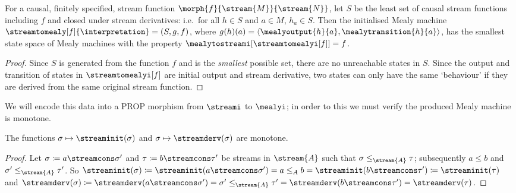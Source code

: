 \begin{corollary}\label{cor:minimal-mealy}
    For a causal, finitely specified, stream function \(
    \morph{f}{\stream{M}}{\stream{N}}
    \), let \(S\) be the least set of
    causal stream functions including \(f\) and closed under stream derivatives:
    i.e.\ for all \(h \in S\) and \(a \in M\), \(h_a \in S\).
    Then the initialised Mealy machine \(
    \streamtomealy[f]{\interpretation} = (S, g, f)
    \), where \(
    g(h)(a) = \langle \mealyoutput{h}{a}, \mealytransition{h}{a}\rangle
    \), has the smallest state space of Mealy machines with the property \(
    \mealytostreami[\streamtomealyi[f]] = f
    \).
\end{corollary}
\begin{proof}
    Since \(S\) is generated from the function \(f\) and is the \emph{smallest}
    possible set, there are no unreachable states in \(S\).
    Since the output and transition of states in
    \(\streamtomealyi[f]\) are initial output and stream derivative, two
    states can only have the same `behaviour' if they are derived from the same
    original stream function.
\end{proof}

We will encode this data into a PROP morphism from \(\streami\) to \(\mealyi\);
in order to this we must verify the produced Mealy machine is monotone.

\begin{lemma}\label{lem:head-tail-monotone}
    The functions \(\sigma \mapsto \streaminit(\sigma)\) and
    \(\sigma \mapsto \streamderv(\sigma)\) are monotone.
\end{lemma}
\begin{proof}
    Let \(\sigma \coloneqq a \streamcons \sigma^\prime\) and
    \(\tau \coloneqq b \streamcons \tau^\prime\) be streams in \(\stream{A}\)
    such that \(\sigma \leq_{\stream{A}} \tau\); subsequently \(a \leq b\) and
    \(\sigma^\prime \leq_{\stream{A}} \tau^\prime\).
    So \(
    \streaminit(\sigma) \coloneqq
    \streaminit(a \streamcons \sigma^\prime) =
    a \leq_{A}
    b =
    \streaminit(b \streamcons \tau^\prime) \coloneqq
    \streaminit(\tau)
    \) and \(
    \streamderv(\sigma) \coloneqq
    \streamderv(a \streamcons \sigma^\prime) =
    \sigma^\prime \leq_{\stream{A}}
    \tau^\prime =
    \streamderv(b \streamcons \tau^\prime) =
    \streamderv(\tau)
    \).
\end{proof}

